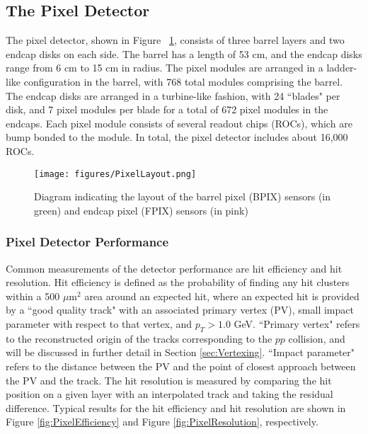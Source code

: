 \subsection{The Pixel Detector}

The pixel detector, shown in Figure ~\ref{fig:PixelLayout}, consists of three barrel layers and two endcap disks on each side. The barrel has a length of 53 cm, and the endcap disks range from 6 cm to 15 cm in radius. The pixel modules are arranged in a ladder-like configuration in the barrel, with 768 total modules comprising the barrel. The endcap disks are arranged in a turbine-like fashion, with 24 ``blades" per disk, and 7 pixel modules per blade for a total of 672 pixel modules in the endcaps.
Each pixel module consists of several readout chips (ROCs), which are bump bonded to the module. In total, the pixel detector includes about 16,000 ROCs\cite{Pixel}.

\begin{figure}\centering
  \texttt{[image: figures/PixelLayout.png]}
  \caption{\label{fig:PixelLayout} Diagram indicating the layout of the barrel pixel (BPIX) sensors (in green) and endcap pixel (FPIX) sensors (in pink)}
\end{figure}

\subsubsection{Pixel Detector Performance}

Common measurements of the detector performance are hit efficiency and hit resolution. Hit efficiency is defined as the probability of finding any hit clusters within a 500 $\mu$m$^2$ area around an expected hit, where an expected hit is provided by a ``good quality track" with an associated primary vertex (PV), small impact parameter with respect to that vertex, and $p_{T} > 1.0$ GeV. ``Primary vertex" refers to the reconstructed origin of the tracks corresponding to the $pp$ collision, and will be discussed in further detail in Section \ref{sec:Vertexing}. ``Impact parameter" refers to the distance between the PV and the point of closest approach between the PV and the track. The hit resolution is measured by comparing the hit position on a given layer with an interpolated track and taking the residual difference. Typical results for the hit efficiency and hit resolution are shown in Figure \ref{fig:PixelEfficiency} and Figure \ref{fig:PixelResolution}, respectively\cite{PixelPerformance}.

